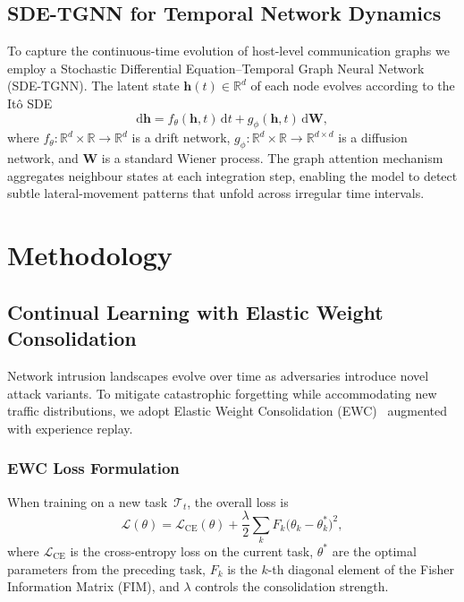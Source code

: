 \documentclass[journal,twoside]{IEEEtran}
\begin{document}
\subsection{SDE-TGNN for Temporal Network Dynamics}
\label{sec:sde_tgnn}

To capture the continuous-time evolution of host-level communication
graphs we employ a Stochastic Differential Equation--Temporal Graph
Neural Network (SDE-TGNN).  The latent state
$\mathbf{h}(t)\in\mathbb{R}^{d}$ of each node evolves according to the
It\^{o} SDE
\begin{equation}
  \mathrm{d}\mathbf{h}
  = f_\theta(\mathbf{h},t)\,\mathrm{d}t
    + g_\phi(\mathbf{h},t)\,\mathrm{d}\mathbf{W},
  \label{eq:sde}
\end{equation}
where $f_\theta\colon\mathbb{R}^{d}\times\mathbb{R}\to\mathbb{R}^{d}$
is a drift network, $g_\phi\colon\mathbb{R}^{d}\times\mathbb{R}\to
\mathbb{R}^{d\times d}$ is a diffusion network, and $\mathbf{W}$ is a
standard Wiener process.  The graph attention mechanism aggregates
neighbour states at each integration step, enabling the model to detect
subtle lateral-movement patterns that unfold across irregular time
intervals.


\section{Methodology}
\label{sec:methodology}

\subsection{Continual Learning with Elastic Weight Consolidation}
\label{sec:ewc}

Network intrusion landscapes evolve over time as adversaries introduce
novel attack variants.  To mitigate catastrophic forgetting while
accommodating new traffic distributions, we adopt Elastic Weight
Consolidation (EWC)~\cite{kirkpatrick2017overcoming} augmented with
experience replay.

\subsubsection{EWC Loss Formulation}
When training on a new task~$\mathcal{T}_t$, the overall loss is
\begin{equation}
  \mathcal{L}(\theta)
  = \mathcal{L}_{\mathrm{CE}}(\theta)
    + \frac{\lambda}{2}\sum_{k}F_k\bigl(\theta_k - \theta_k^{*}\bigr)^{2},
  \label{eq:ewc}
\end{equation}
where $\mathcal{L}_{\mathrm{CE}}$ is the cross-entropy loss on the
current task, $\theta^{*}$ are the optimal parameters from the preceding
task, $F_k$ is the $k$-th diagonal element of the Fisher Information
Matrix (FIM), and $\lambda$ controls the consolidation strength.
\end{document}

